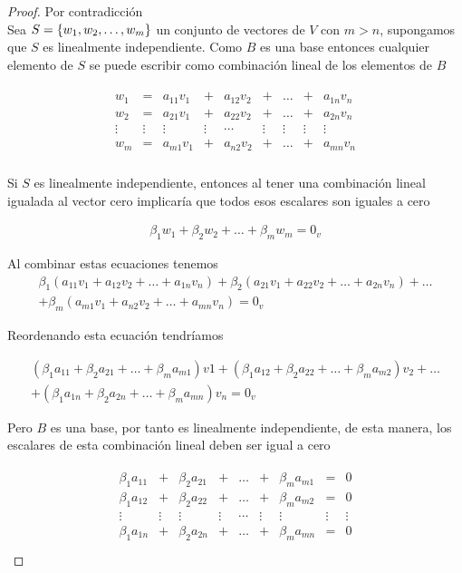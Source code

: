 \begin{proof}
Por contradicción ~\\
Sea $S= \lbrace w_1, w_2, \ldots, w_m \rbrace$ un conjunto de vectores de $V$ con $m>n$, supongamos que $S$ es linealmente independiente. Como $B$ es una base entonces cualquier elemento de $S$ se puede escribir como combinación lineal de los elementos de $B$

\begin{align*}
    \begin{array}{ccccccccc}
        w_1 &=& a_{11} v_1&+&a_{12} v_2 &+&\ldots &+&a_{1n} v_n\\
        w_2&=&a_{21} v_1&+&a_{22} v_2 &+&\ldots &+&a_{2n} v_n\\
        \vdots&\vdots&\vdots&\vdots&\cdots&\vdots&\vdots&\vdots&\vdots\\
        w_m&=&a_{m1} v_1&+&a_{n2} v_2 &+&\ldots &+&a_{mn} v_n\\
    \end{array}
\end{align*}

Si $S$ es linealmente independiente, entonces al tener una combinación lineal igualada al vector cero implicaría que todos esos escalares son iguales a cero

\begin{eqnarray*}
\beta_1 w_1+\beta_2 w_2 +\ldots +\beta_m w_m=0_v
\end{eqnarray*}

Al combinar estas ecuaciones tenemos
\begin{eqnarray*}
\beta_1 (a_{11} v_1+a_{12} v_2 +\ldots +a_{1n} v_n)+
\beta_2 (a_{21} v_1+a_{22} v_2 +\ldots +a_{2n} v_n) +\ldots \\+
\beta_m (a_{m1} v_1+a_{n2} v_2 +\ldots +a_{mn} v_n)
=0_v
\end{eqnarray*}

Reordenando esta ecuación tendríamos


\begin{eqnarray*}
(\beta_1 a_{11}+\beta_2 a_{21}+\ldots+\beta_m a_{m1})v1+
(\beta_1 a_{12}+\beta_2 a_{22}+\ldots+\beta_m a_{m2})v_2+
\ldots\\+
(\beta_1 a_{1n}+\beta_2 a_{2n}+\ldots+\beta_m a_{mn})v_n=0_v
\end{eqnarray*}

Pero $B$ es una base, por tanto es linealmente independiente, de esta manera, los escalares de esta combinación lineal deben ser igual a cero

\begin{align*}
\begin{array}{ccccccccc}
\beta_1 a_{11}&+&\beta_2 a_{21}&+&\ldots&+&\beta_m a_{m1}&=&0\\
\beta_1 a_{12}&+&\beta_2 a_{22}&+&\ldots&+&\beta_m a_{m2}&=&0\\
\vdots&\vdots&\vdots&\vdots&\cdots&\vdots&\vdots&\vdots&\vdots\\
\beta_1 a_{1n}&+&\beta_2 a_{2n}&+&\ldots&+&\beta_m a_{mn}&=&0\\
\end{array}
\end{align*}



\end{proof}
